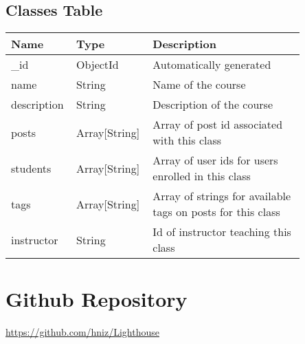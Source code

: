 \documentclass[preprint,11pt,3p]{article}
\begin{document}
\newpage

\subsection{Classes Table}
\begingroup
\setlength{\tabcolsep}{15pt} %
\renewcommand{\arraystretch}{1.5} %
\begin{tabular}{| p{0.15\linewidth} | p{0.20\linewidth} | p{0.5\linewidth} |}
	\hline
	\textbf{Name} & \textbf{Type} & \textbf{Description} \\
	\hline
	_id & ObjectId & Automatically generated\\
	\hline
	name & String & Name of the course\\
	\hline
	description & String & Description of the course\\
	\hline
	posts & Array[String] & Array of post id associated with this class\\
	\hline
	students & Array[String] & Array of user ids for users enrolled in this class\\
	\hline
	tags & Array[String] & Array of strings for available tags on posts for this class\\
	\hline
	instructor & String & Id of instructor teaching this class\\
	\hline
\end{tabular}
\endgroup

\newpage

\section{Github Repository}
\href{https://github.com/hniz/Lighthouse}{https://github.com/hniz/Lighthouse}
\end{document}
